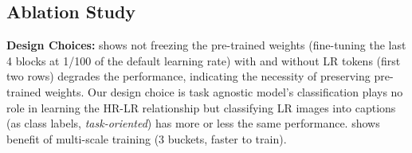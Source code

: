 
\subsection{Ablation Study}
\noindent \textbf{Design Choices:} \textbf{} shows 
not freezing the pre-trained weights (\ie fine-tuning the last 4 blocks at 1/100 of the default learning rate) with and without LR tokens (first two rows) degrades the performance, indicating the necessity of preserving pre-trained weights. 
Our design choice is task agnostic \ie model's classification plays no role in learning the HR-LR relationship but classifying LR images into captions (as class labels, \textit{task-oriented}) has more or less the same performance.
\textbf{} shows benefit of multi-scale training
(3 buckets, faster to train). 

